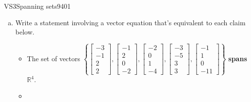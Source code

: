 \begin{exercise}{VS3}{Spanning sets}{9401} 
\begin{exerciseStatement} 

\begin{enumerate}[(a)]
\item  

 Write a statement involving a vector equation that's equivalent to each claim below. 

 

\begin{itemize}
\item  

 The set of vectors \(\left\{ \left[\begin{array}{c}
-3 \\
-1 \\
2 \\
2
\end{array}\right] , \left[\begin{array}{c}
-1 \\
2 \\
0 \\
-2
\end{array}\right] , \left[\begin{array}{c}
-2 \\
0 \\
1 \\
-4
\end{array}\right] , \left[\begin{array}{c}
-3 \\
-5 \\
3 \\
3
\end{array}\right] , \left[\begin{array}{c}
-1 \\
1 \\
0 \\
-11
\end{array}\right] \right\}\) \textbf{spans} \(\mathbb R^4\). 

 
\item  


\end{itemize}
\end{enumerate}
\end{exerciseStatement}
\end{exercise}
